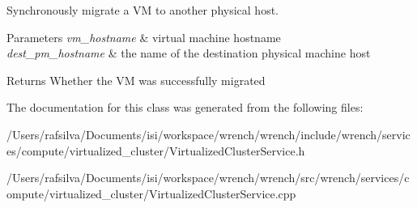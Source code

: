 Synchronously migrate a VM to another physical host. 


\begin{DoxyParams}{Parameters}
{\em vm\+\_\+hostname} & virtual machine hostname \\
\hline
{\em dest\+\_\+pm\+\_\+hostname} & the name of the destination physical machine host\\
\hline
\end{DoxyParams}
\begin{DoxyReturn}{Returns}
Whether the VM was successfully migrated 
\end{DoxyReturn}


The documentation for this class was generated from the following files\+:\begin{DoxyCompactItemize}
\item 
/\+Users/rafsilva/\+Documents/isi/workspace/wrench/wrench/include/wrench/services/compute/virtualized\+\_\+cluster/Virtualized\+Cluster\+Service.\+h\item 
/\+Users/rafsilva/\+Documents/isi/workspace/wrench/wrench/src/wrench/services/compute/virtualized\+\_\+cluster/Virtualized\+Cluster\+Service.\+cpp\end{DoxyCompactItemize}
